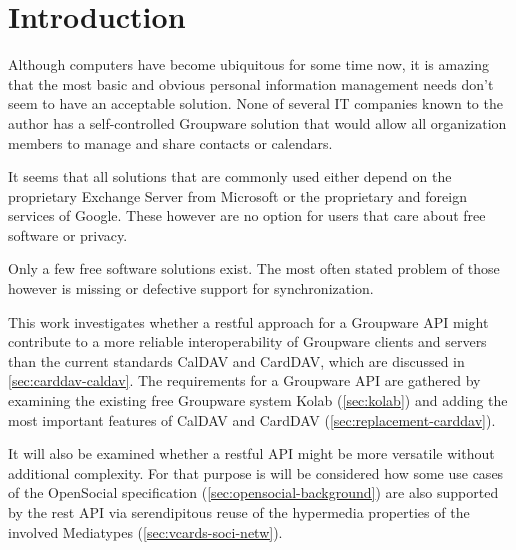 \documentclass[11pt,a4paper,headsepline,twoside]{scrartcl}		%
\begin{document}
\tableofcontents{}
\newpage{}

\section{Introduction}
\label{sec:introduction}



Although computers have become ubiquitous for some time now, it is amazing that the
most basic and obvious personal information management needs don't seem to have
an acceptable solution. None of several IT companies known to the author has a
self-controlled Groupware solution that would allow all organization members to
manage and share contacts or calendars.

It seems that all solutions that are commonly used either depend on the
proprietary Exchange Server from Microsoft or the proprietary and foreign
services of Google. These however are no option for users that care about free
software or privacy.

Only a few free software solutions exist. The most often stated problem of those
however is missing or defective support for synchronization.

This work investigates whether a restful approach for a Groupware API might
contribute to a more reliable interoperability of Groupware clients and servers
than the current standards CalDAV and CardDAV, which are discussed in
\autoref{sec:carddav-caldav}. The requirements for a Groupware API are gathered
by examining the existing free Groupware system Kolab (\autoref{sec:kolab}) and
adding the most important features of CalDAV and CardDAV
(\autoref{sec:replacement-carddav}).

It will also be examined whether a restful API might be more versatile without
additional complexity. For that purpose is will be considered how some use
cases of the OpenSocial specification (\autoref{sec:opensocial-background}) are
also supported by the rest API via serendipitous reuse of the hypermedia
properties of the involved Mediatypes (\autoref{sec:vcards-soci-netw}).
\end{document}
